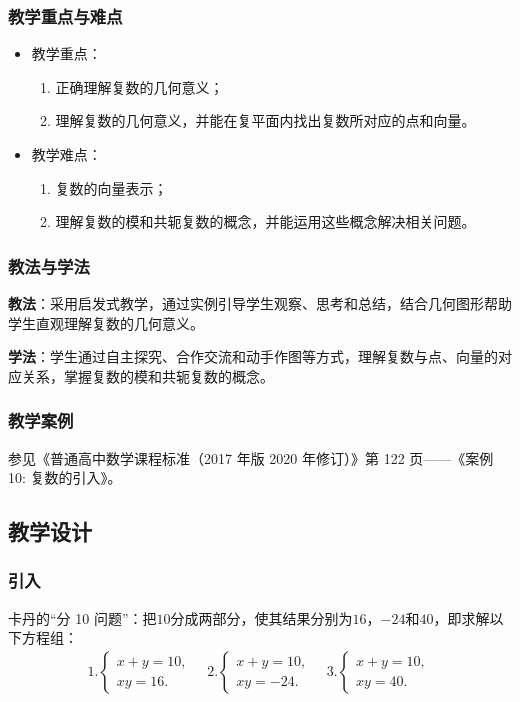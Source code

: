 \subsubsection{教学重点与难点}
\begin{itemize}
    \item 教学重点：
          \begin{enumerate}
              \item 正确理解复数的几何意义；
              \item 理解复数的几何意义，并能在复平面内找出复数所对应的点和向量。
          \end{enumerate}
    \item 教学难点：
          \begin{enumerate}
              \item 复数的向量表示；
              \item 理解复数的模和共轭复数的概念，并能运用这些概念解决相关问题。
          \end{enumerate}
\end{itemize}

\subsubsection{教法与学法}
\textbf{教法}：采用启发式教学，通过实例引导学生观察、思考和总结，结合几何图形帮助学生直观理解复数的几何意义。

\textbf{学法}：学生通过自主探究、合作交流和动手作图等方式，理解复数与点、向量的对应关系，掌握复数的模和共轭复数的概念。

\subsubsection{教学案例}
参见《普通高中数学课程标准（2017 年版 2020 年修订）》第 122 页——《案例 10: 复数的引入》。


\subsection{教学设计}
\subsubsection{引入}
\begin{activity}
    卡丹的“分 10 问题”：把$10$分成两部分，使其结果分别为$16$，$-24$和$40$，即求解以下方程组：
    \begin{align*}
        1. \begin{cases}
               x+y=10, \\
               xy=16.
           \end{cases}
        \quad
        2. \begin{cases}
               x+y=10, \\
               xy=-24.
           \end{cases}
        \quad
        3. \begin{cases}
               x+y=10, \\
               xy=40.
           \end{cases}
    \end{align*}
\end{activity}

